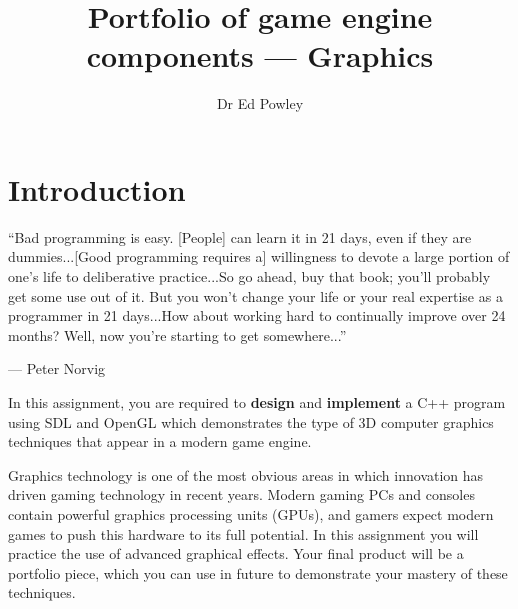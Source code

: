 \documentclass{../fal_assignment}
\title{Portfolio of game engine components --- Graphics}
\author{Dr Ed Powley}
\begin{document}
\maketitle

\section*{Introduction}

\begin{marginquote}
``Bad programming is easy. [People] can learn it in 21 days, even if they are dummies...[Good programming requires a] willingness to devote a large portion of one's life to deliberative practice...So go ahead, buy that book; you'll probably get some use out of it. But you won't change your life or your real expertise as a programmer in 21 days...How about working hard to continually improve over 24 months? Well, now you're starting to get somewhere...''
\par --- Peter Norvig
\end{marginquote}

In this assignment, you are required to \textbf{design} and \textbf{implement} a C++ program using SDL and OpenGL
which demonstrates the type of 3D computer graphics techniques that appear in a modern game engine.

Graphics technology is one of the most obvious areas in which innovation has driven gaming technology in recent years.
Modern gaming PCs and consoles contain powerful graphics processing units (GPUs),
and gamers expect modern games to push this hardware to its full potential.
In this assignment you will practice the use of advanced graphical effects.
Your final product will be a portfolio piece, which you can use in future to demonstrate your mastery of these techniques.
\end{document}
